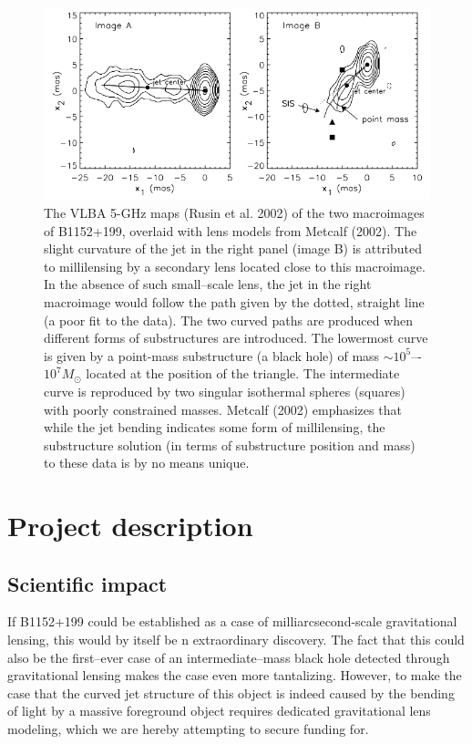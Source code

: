 \documentclass[a4paper, 11pt]{article}
\begin{document}
\begin{figure}[tbh]
\centering
\includegraphics[scale=0.75]{Figure-2002.jpg}
\caption{The VLBA 5-GHz maps (Rusin et al. 2002) of the two macroimages of B1152+199, overlaid with lens models from Metcalf (2002). The slight curvature of the jet in the right panel (image B) is attributed to millilensing by a secondary lens located close to this macroimage. In the absence of such small--scale lens, the jet in the right macroimage would follow the path given by the dotted, straight line (a poor fit to the data). The two curved paths are produced when different forms of substructures are introduced. The lowermost curve is given by a point-mass substructure (a black hole) of mass $\sim 10^5$–-$10^7 M_\odot$ located at the position of the triangle. The intermediate curve is reproduced by two singular isothermal spheres (squares) with poorly constrained masses. Metcalf (2002) emphasizes that while the jet bending indicates some form of millilensing, the substructure solution (in terms of substructure position and mass) to these data is by no means unique.}
\end{figure}


\section{Project description}

\subsection{Scientific impact}
If B1152+199 could be established as a case of milliarcsecond-scale gravitational lensing, this would by itself be n extraordinary discovery. The fact that this could also be the first--ever case of an intermediate--mass black hole detected through gravitational lensing makes the case even more tantalizing. However, to make the case that the curved jet structure of this object is indeed caused by the bending of light by a massive foreground object requires dedicated gravitational lens modeling, which we are hereby attempting to secure funding for.
\end{document}
